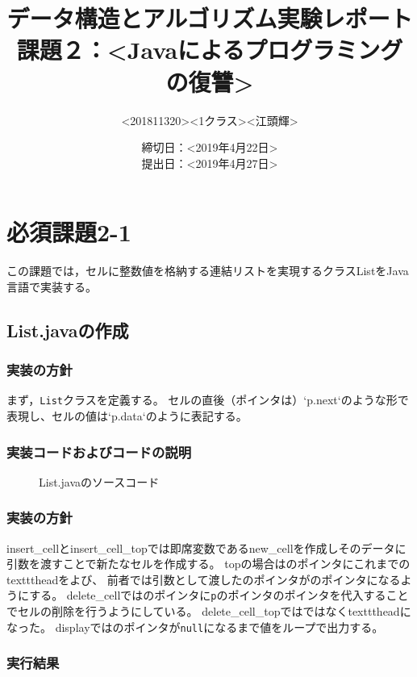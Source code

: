 \documentclass[10.5pt,a4paper]{jsarticle}
\title{データ構造とアルゴリズム実験レポート\\課題２：\textless Javaによるプログラミングの復讐\textgreater}
\author{\textless 201811320\textgreater \textless 1クラス\textgreater \textless 江頭輝\textgreater}
\date{締切日：\textless 2019年4月22日\textgreater\\提出日：\textless 2019年4月27日\textgreater}
\begin{document}
\maketitle

\section{必須課題2-1}

この課題では，セルに整数値を格納する連結リストを実現するクラスListをJava言語で実装する。

\subsection{List.javaの作成}
\subsubsection{実装の方針}

まず，\texttt{List}クラスを定義する。
セルの直後（ポインタは）`p.next`のような形で表現し、セルの値は`p.data`のように表記する。


\subsubsection{実装コードおよびコードの説明}

\begin{figure}[t]
  \begin{center}
   
   \caption{List.javaのソースコード}
  \end{center}
\end{figure}

\subsubsection{実装の方針}
insert\_cellとinsert\_cell\_topでは即席変数であるnew\_cellを作成しそのデータに引数を渡すことで新たなセルを作成する。
topの場合はのポインタにこれまでのtexttt{head}をよび、
前者では引数として渡したのポインタがのポインタになるようにする。
delete\_cellではのポインタに\texttt{p}のポインタのポインタを代入することでセルの削除を行うようにしている。
delete\_cell\_topではではなくtexttt{head}になった。
displayではのポインタが\texttt{null}になるまで値をループで出力する。


\subsubsection{実行結果}\label{sec:ls_code_exec}
\end{document}
